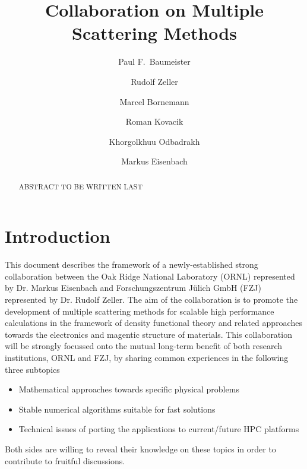 \documentclass{llncs}
\begin{document}
\title{Collaboration on Multiple Scattering Methods}

\author{ 
  Paul F.~Baumeister 
  \and
  Rudolf Zeller
  \and
  Marcel Bornemann
  \and
  Roman Kovacik
  \and
  Khorgolkhuu Odbadrakh
  \and
  Markus Eisenbach
}


\maketitle
\thispagestyle{firstpage}

\begin{abstract}
  ABSTRACT TO BE WRITTEN LAST
\end{abstract}

\section{Introduction} \label{section:intro}
This document describes the framework of a newly-established strong collaboration
between the Oak Ridge National Laboratory (ORNL) represented by Dr. Markus Eisenbach
and Forschungszentrum J\"ulich GmbH (FZJ) represented by Dr. Rudolf Zeller.
The aim of the collaboration is to promote the development of multiple scattering methods
for scalable high performance calculations in the framework of density functional theory
and related approaches towards the electronics and magentic structure of materials.
This collaboration will be strongly focussed onto the mutual long-term benefit of both research institutions, 
ORNL and FZJ, by sharing common experiences in the following three subtopics
\begin{itemize}
 \item Mathematical approaches towards specific physical problems  
 \item Stable numerical algorithms suitable for fast solutions
 \item Technical issues of porting the applications to current/future HPC platforms
\end{itemize}
Both sides are willing to reveal their knowledge on these topics in order to
contribute to fruitful discussions.
\end{document}
